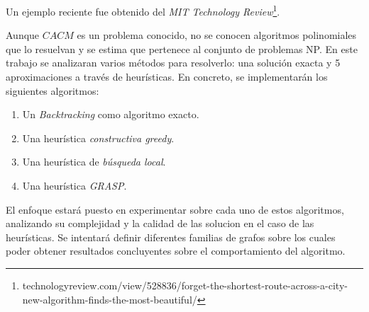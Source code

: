 Un ejemplo reciente fue obtenido del \textit{MIT Technology Review}\footnote{technologyreview.com/view/528836/forget-the-shortest-route-across-a-city-new-algorithm-finds-the-most-beautiful/}. 

Aunque $CACM$ es un problema conocido, no se conocen algoritmos polinomiales que lo resuelvan y se estima que pertenece al conjunto de problemas NP. En este trabajo se analizaran varios métodos para resolverlo: una soluci\'on exacta y 5 aproximaciones a trav\'es de heur\'isticas. En concreto, se implementarán los siguientes algoritmos:

\begin{enumerate}
\item Un \textit{Backtracking} como algoritmo exacto.
\item Una heur\'istica \textit{constructiva greedy}.
\item Una heur\'istica de \textit{b\'usqueda local}.
\item Una heur\'istica \textit{GRASP}.
\end{enumerate}

El enfoque estará puesto en experimentar sobre cada uno de estos algoritmos, analizando su complejidad y la calidad de las solucion en el caso de las heur\'isticas.
Se intentará definir diferentes familias de grafos sobre los cuales poder obtener resultados concluyentes sobre el comportamiento del algoritmo.
